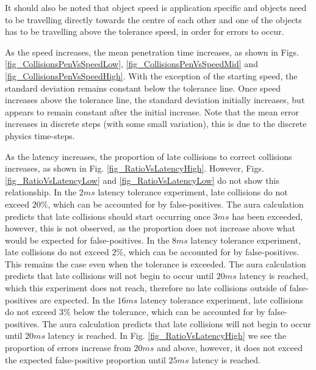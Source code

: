It should also be noted that object speed is application specific and objects need to be travelling directly towards the centre of each other and one of the objects has to be travelling above the tolerance speed, in order for errors to occur.

As the speed increases, the mean penetration time increases, as shown in Figs. \ref{fig_CollisionsPenVsSpeedLow}, \ref{fig_CollisionsPenVsSpeedMid} and \ref{fig_CollisionsPenVsSpeedHigh}. With the exception of the starting speed, the standard deviation remains constant below the tolerance line. Once speed increases above the tolerance line, the standard deviation initially increases, but appears to remain constant after the initial increase. Note that the mean error increases in discrete steps (with some small variation), this is due to the discrete physics time-steps.

As the latency increases, the proportion of late collisions to correct collisions increases, as shown in Fig. \ref{fig_RatioVsLatencyHigh}. However, Figs. \ref{fig_RatioVsLatencyLow} and \ref{fig_RatioVsLatencyLow} do not show this relationship. In the $2ms$ latency tolerance experiment, late collisions do not exceed $20\%$, which can be accounted for by false-positives. The aura calculation predicts that late collisions should start occurring once $3ms$ has been exceeded, however, this is not observed, as the proportion does not increase above what would be expected for false-positives.
In the $8ms$ latency tolerance experiment, late collisions do not exceed $2\%$, which can be accounted for by false-positives. This remains the case even when the tolerance is exceeded. The aura calculation predicts that late collisions will not begin to occur until $20ms$ latency is reached, which this experiment does not reach, therefore no late collisions outside of false-positives are expected. In the $16ms$ latency tolerance experiment, late collisions do not exceed $3\%$ below the tolerance, which can be accounted for by false-positives. The aura calculation predicts that late collisions will not begin to occur until $20ms$ latency is reached. In Fig. \ref{fig_RatioVsLatencyHigh} we see the proportion of errors increase from $20ms$ and above, however, it does not exceed the expected false-positive proportion until $25ms$ latency is reached.



